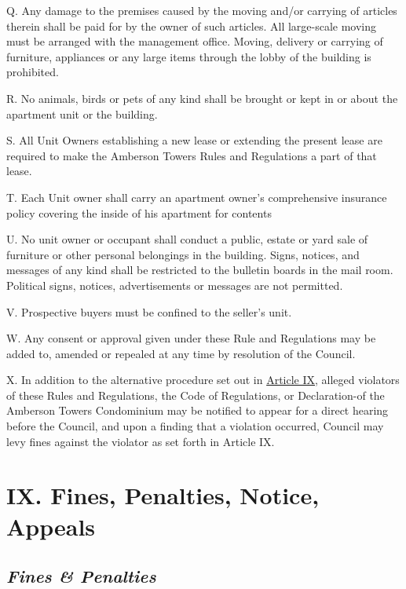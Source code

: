 \documentclass[
  14pt,
]{book}
\begin{document}
Q. Any damage to the premises caused by the moving and/or carrying of articles therein shall be paid for by the owner of such articles. All large-scale moving must be arranged with the management office. Moving, delivery or carrying of furniture, appliances or any large items through the lobby of the building is prohibited.

R. No animals, birds or pets of any kind shall be brought or kept in or about the apartment unit or the building.

S. All Unit Owners establishing a new lease or extending the present lease are required to make the Amberson Towers Rules and Regulations a part of that lease.

T. Each Unit owner shall carry an apartment owner's comprehensive insurance policy covering the inside of his apartment for contents

U. No unit owner or occupant shall conduct a public, estate or yard sale of furniture or other personal belongings in the building. Signs, notices, and messages of any kind shall be restricted to the bulletin boards in the mail room. Political signs, notices, advertisements or messages are not permitted.

V. Prospective buyers must be confined to the seller's unit.

W. Any consent or approval given under these Rule and Regulations may be added to, amended or repealed at any time by resolution of the Council.

X. In addition to the alternative procedure set out in \protect\hyperlink{ArtIX}{Article IX}, alleged violators of these Rules and Regulations, the Code of Regulations, or Declaration-of the Amberson Towers Condominium may be notified to appear for a direct hearing before the Council, and upon a finding that a violation occurred, Council may levy fines against the violator as set forth in Article IX.

\hypertarget{ix.-fines-penalties-notice-appeals}{%
\section*{IX. Fines, Penalties, Notice, Appeals}\label{ix.-fines-penalties-notice-appeals}}

\hypertarget{fines-penalties}{%
\subsection*{\texorpdfstring{\emph{Fines \& Penalties}}{Fines \& Penalties}}\label{fines-penalties}}
\end{document}
